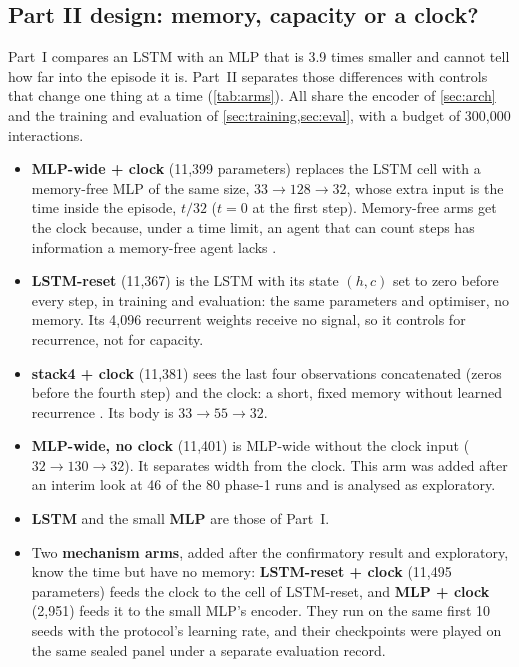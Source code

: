 \subsection{Part II design: memory, capacity or a clock?}
\label{sec:methods-part2}

Part~I compares an LSTM with an MLP that is 3.9 times smaller and cannot tell how far into the
episode it is. Part~II separates those differences with controls that change one thing at a time
(\cref{tab:arms}). All share the encoder of \cref{sec:arch} and the training and evaluation of
\cref{sec:training,sec:eval}, with a budget of 300,000 interactions.

\begin{itemize}
  \item \textbf{MLP-wide + clock} (11,399 parameters) replaces the LSTM cell with a memory-free
  MLP of the same size, $33\to128\to32$, whose extra input is the time inside the episode,
  $t/32$ ($t=0$ at the first step). Memory-free arms get the clock because, under a time limit,
  an agent that can count steps has information a memory-free agent lacks
  \citep{pardo2018timelimits}.
  \item \textbf{LSTM-reset} (11,367) is the LSTM with its state $(h,c)$ set to zero before every
  step, in training and evaluation: the same parameters and optimiser, no memory. Its 4,096
  recurrent weights receive no signal, so it controls for recurrence, not for capacity.
  \item \textbf{stack4 + clock} (11,381) sees the last four observations concatenated (zeros
  before the fourth step) and the clock: a short, fixed memory without learned recurrence
  \citep{hausknecht2015drqn}. Its body is $33\to55\to32$.
  \item \textbf{MLP-wide, no clock} (11,401) is MLP-wide without the clock input
  ($32\to130\to32$). It separates width from the clock. This arm was added after an interim look
  at 46 of the 80 phase-1 runs and is analysed as exploratory.
  \item \textbf{LSTM} and the small \textbf{MLP} are those of Part~I.
  \item Two \textbf{mechanism arms}, added after the confirmatory result and exploratory, know
  the time but have no memory: \textbf{LSTM-reset + clock} (11,495 parameters) feeds the clock to
  the cell of LSTM-reset, and \textbf{MLP + clock} (2,951) feeds it to the small MLP's encoder.
  They run on the same first 10 seeds with the protocol's learning rate, and their checkpoints
  were played on the same sealed panel under a separate evaluation record.
\end{itemize}

